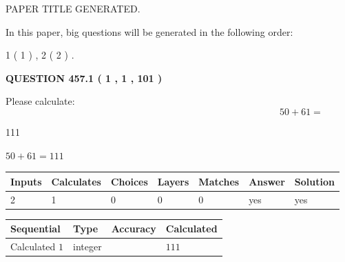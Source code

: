 \documentclass[12pt]{article}
\begin{document}
   
 PAPER TITLE GENERATED.
   
   
   
\vspace{0.2in}
   
In this paper, big questions will be generated in the following order: 
   
   
   1 ( 1 )
 ,
   2 ( 2 )
 .
  
\vspace{0.2in}
  
{\textbf{\Large{QUESTION
457.1 
 ( 1 , 1 , 101 )
}}}
  
  
 
Please calculate:
\begin{equation}
50 +  %
61 = \nonumber
\end{equation}
 
 
 
\noindent{}
 
 

111
 
 
\noindent{}
 
 

 
 
 
\noindent{}
 
 

$ %
50 +  %
61=   %
111$
 
 
\noindent{}
 
 

 
   
   
   
   
\noindent\begin{tabular}{|l|l|l|l|l|l|l|}
 \hline
Inputs & Calculates & Choices & Layers & Matches & Answer & Solution \\ \hline
 2  & 
 1  & 
 0
  & 
 0  & 
 0  & 
  yes & 
  yes 
  \\ \hline
 \end{tabular}
   
   
   
   
\noindent{}
   
   
  
  
\noindent\begin{tabular}{|l|l|l|l|}
\hline
 Sequential & Type & Accuracy & Calculated \\ 
\hline
 
 
  Calculated $  1 $ & integer &  & 
  $ 111 $ 
 \\  \hline  
 \end{tabular}
   
\end{document}
